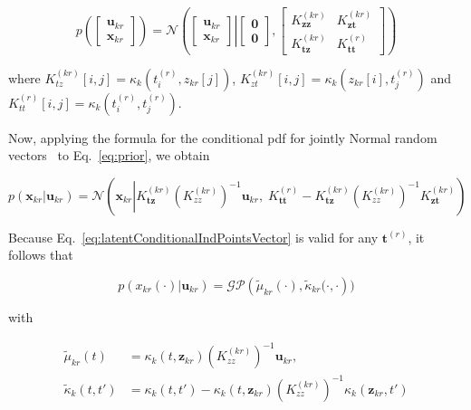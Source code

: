 \documentclass[12pt]{article}
\begin{document}
\begin{equation}
    p\left(\left[\begin{array}{c}
        \mathbf{u}_{kr}\\
        \mathbf{x}_{kr}
    \end{array}\right]\right)
    =\mathcal{N}\left(\left.\left[\begin{array}{c}
        \mathbf{u}_{kr}\\
        \mathbf{x}_{kr}
    \end{array}\right]\right|\left[\begin{array}{c}
        \mathbf{0}\\
        \mathbf{0}
    \end{array}\right],\left[\begin{array}{cc}
        K_\mathbf{zz}^{(kr)}&K_\mathbf{zt}^{(kr)}\\
        K_\mathbf{tz}^{(kr)}&K_\mathbf{tt}^{(r)}
    \end{array}\right]\right)
    \label{eq:prior}
\end{equation}

\noindent where
$K_{tz}^{(kr)}[i,j]=\kappa_k(t^{(r)}_i,z_{kr}[j])$,
$K_{zt}^{(kr)}[i,j]=\kappa_k(z_{kr}[i],t_j^{(r)})$
and
$K_{tt}^{(r)}[i,j]=\kappa_k(t_i^{(r)},t_j^{(r)})$.

Now, applying the formula for the conditional pdf for jointly Normal random
vectors~\citep[][Eq. 2.116]{bishop06} to Eq.~\ref{eq:prior}, we obtain

\begin{equation}
    p(\mathbf{x}_{kr}|\mathbf{u}_{kr})=\mathcal{N}\left(\mathbf{x}_{kr}\left|K_\mathbf{tz}^{(kr)}\left(K_{zz}^{(kr)}\right)^{-1}\mathbf{u}_{kr},\;K_\mathbf{tt}^{(r)}-K_\mathbf{tz}^{(kr)}\left(K_{zz}^{(kr)}\right)^{-1}K_\mathbf{zt}^{(kr)}\right.\right)
    \label{eq:latentConditionalIndPointsVector}
\end{equation}

Because Eq.~\ref{eq:latentConditionalIndPointsVector} is valid for any
$\mathbf{t}^{(r)}$, it follows that

\begin{equation*}
    p(x_{kr}(\cdot)|\mathbf{u}_{kr})=\mathcal{GP}\left(\tilde{\mu}_{kr}(\cdot), \tilde{\kappa}_{kr}(\cdot,\cdot\right))
\end{equation*}

\noindent with

\begin{equation*}
    \begin{aligned}
        \tilde{\mu}_{kr}(t)&=\kappa_k(t,\mathbf{z}_{kr})\left(K_{zz}^{(kr)}\right)^{-1}\mathbf{u}_{kr},\\
        \tilde{\kappa}_k(t,t')&=\kappa_k(t,t')-\kappa_k(t,\mathbf{z}_{kr})\left(K_{zz}^{(kr)}\right)^{-1}\kappa_k(\mathbf{z}_{kr},t')
    \end{aligned}
\end{equation*}
\end{document}
